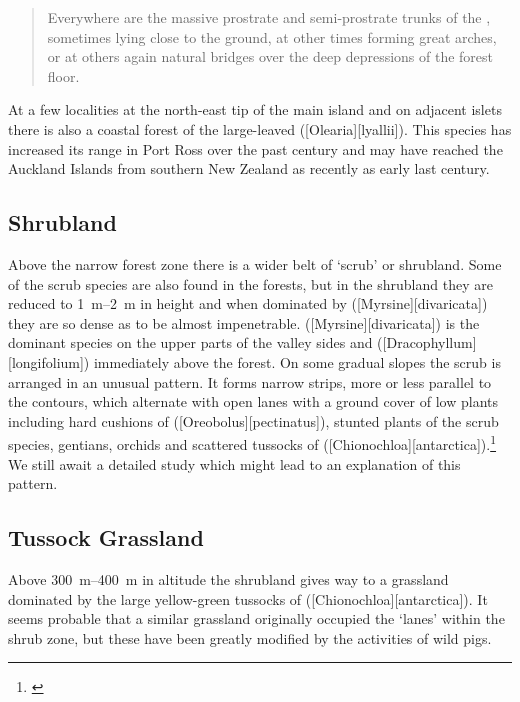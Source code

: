\begin{quote}
	Everywhere are the massive prostrate and semi-prostrate trunks of the , sometimes lying close to the ground, at other times forming great arches, or at others again natural bridges over the deep depressions of the forest floor.
\end{quote}

At a few localities at the north-east tip of the main island and on adjacent islets there is also a coastal forest of the large-leaved  ([Olearia][lyallii]).
This species has increased its range in Port Ross over the past century and may have reached the Auckland Islands from southern New Zealand as recently as early last century.

\subsection{Shrubland}

Above the narrow forest zone there is a wider belt of `scrub' or shrubland.
Some of the scrub species are also found in the forests, but in the shrubland they are reduced to \SIrange{1}{2}{\metre} in height and when dominated by  ([Myrsine][divaricata]) they are so dense as to be almost impenetrable.  ([Myrsine][divaricata]) is the dominant species on the upper parts of the valley sides and  ([Dracophyllum][longifolium]) immediately above the  forest.
On some gradual slopes the scrub is arranged in an unusual pattern.
It forms narrow strips, more or less parallel to the contours, which alternate with open lanes with a ground cover of low plants including hard cushions of  ([Oreobolus][pectinatus]), stunted plants of the scrub species, gentians, orchids and scattered tussocks of  ([Chionochloa][antarctica]).\footnote{\cite{godley1965notes}}
We still await a detailed study which might lead to an explanation of this pattern.

\subsection{Tussock Grassland}

Above \SIrange{300}{400}{\metre} in altitude the shrubland gives way to a grassland dominated by the large yellow-green tussocks of  ([Chionochloa][antarctica]).
It seems probable that a similar grassland originally occupied the `lanes' within the shrub zone, but these have been greatly modified by the activities of wild pigs.

